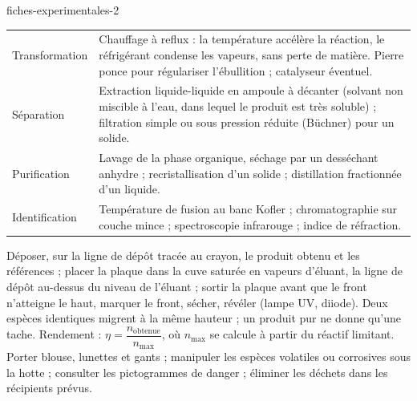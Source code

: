 \begin{blocEdition}{fiches-experimentales-2}
\fontsize{10}{13.5}\selectfont
\label{figedition-fiches-2}
\begin{tabularx}{\linewidth}{@{}p{30mm}Y@{}}\toprule
Transformation & Chauffage à reflux : la température accélère la réaction, le réfrigérant condense les vapeurs, sans
perte de matière. Pierre ponce pour régulariser l'ébullition ; catalyseur éventuel. \\[1mm]
Séparation & Extraction liquide-liquide en ampoule à décanter (solvant non miscible à l'eau, dans lequel le produit est
très soluble) ; filtration simple ou sous pression réduite (Büchner) pour un solide. \\[1mm]
Purification & Lavage de la phase organique, séchage par un desséchant anhydre ; recristallisation d'un solide ;
distillation fractionnée d'un liquide. \\[1mm]
Identification & Température de fusion au banc Kofler ; chromatographie sur couche mince ; spectroscopie infrarouge ;
indice de réfraction. \\\bottomrule
\end{tabularx}
Déposer, sur la ligne de dépôt tracée au crayon, le produit obtenu et les références ; placer la plaque dans la cuve
saturée en vapeurs d'éluant, la ligne de dépôt au-dessus du niveau de l'éluant ; sortir la plaque avant que le front
n'atteigne le haut, marquer le front, sécher, révéler (lampe UV, diiode). Deux espèces identiques migrent à la même
hauteur ; un produit pur ne donne qu'une tache.
Rendement : $\eta=\dfrac{n_\text{obtenue}}{n_\text{max}}$, où $n_\text{max}$ se calcule à partir du réactif limitant. Porter blouse, lunettes et
gants ; manipuler les espèces volatiles ou corrosives sous la hotte ; consulter les pictogrammes de danger ; éliminer
les déchets dans les récipients prévus.
\end{blocEdition}


